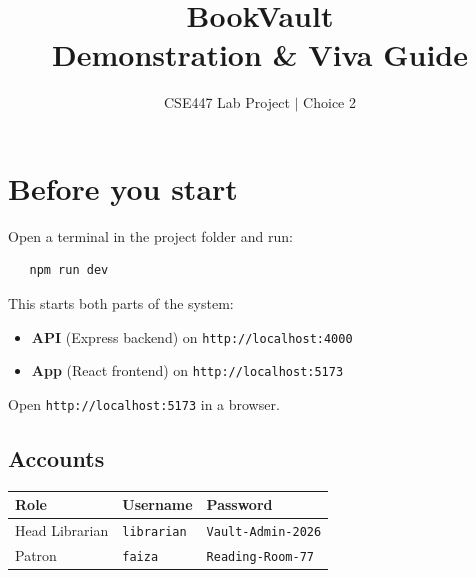 \documentclass[11pt]{article}
\title{\textbf{BookVault} \\[4pt]
\large Demonstration \& Viva Guide}
\author{CSE447 Lab Project $\mid$ Choice 2}
\date{}
\begin{document}
\maketitle
\thispagestyle{fancy}

\begin{center}
\end{center}

\section{Before you start}

Open a terminal in the project folder and run:

\begin{verbatim}
   npm run dev
\end{verbatim}

This starts both parts of the system:

\begin{itemize}[leftmargin=1.4cm, itemsep=2pt]
  \item \textbf{API} (Express backend) on \texttt{http://localhost:4000}
  \item \textbf{App} (React frontend) on \texttt{http://localhost:5173}
\end{itemize}

Open \texttt{http://localhost:5173} in a browser.

\subsection*{Accounts}

\begin{center}
\begin{tabular}{lll}
\toprule
\textbf{Role} & \textbf{Username} & \textbf{Password} \\
\midrule
Head Librarian & \texttt{librarian} & \texttt{Vault-Admin-2026} \\
Patron & \texttt{faiza} & \texttt{Reading-Room-77} \\
\bottomrule
\end{tabular}
\end{center}
\end{document}
